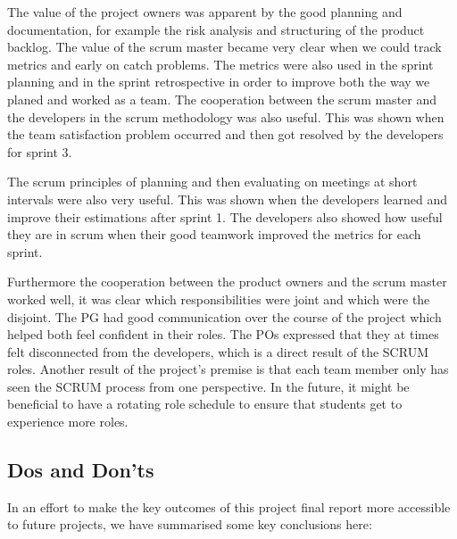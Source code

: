 \documentclass{article}
\begin{document}
The value of the project owners was apparent by the good planning and documentation, for example the risk analysis and structuring of the product backlog. The value of the scrum master became very clear when we could track metrics and early on catch problems. The metrics were also used in the sprint planning and in the sprint retrospective in order to improve both the way we planed and worked as a team.  The cooperation between the scrum master and the developers in the scrum methodology was also useful. This was shown when the team satisfaction problem occurred and then got resolved by the developers for sprint 3.

The scrum principles of planning and then evaluating on meetings at short intervals were also very useful. This was shown when the developers learned and improve their estimations after sprint 1. The developers also showed how useful they are in scrum when their good teamwork improved the metrics for each sprint.

Furthermore the cooperation between the product owners and the scrum master worked well, it was clear which responsibilities were joint and which were the disjoint. The PG had good communication over the course of the project which helped both feel confident in their roles. The POs expressed that they at times felt disconnected from the developers, which is a direct result of the SCRUM roles. Another result of the project's premise is that each team member only has seen the SCRUM process from one perspective. In the future, it might be beneficial to have a rotating role schedule to ensure that students get to experience more roles. 

\subsection{Dos and Don'ts}
In an effort to make the key outcomes of this project final report more accessible to future projects, we have summarised some key conclusions here:
\end{document}
